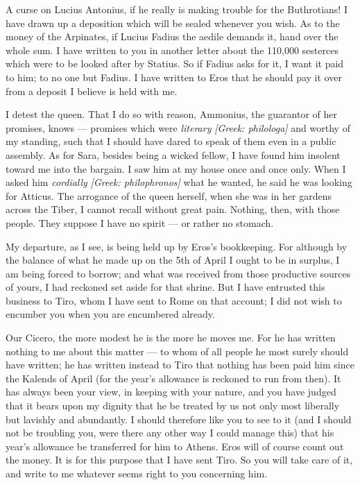 

 A curse on Lucius Antonius, if he really is making trouble for the Buthrotians! I have drawn up a deposition which will be sealed whenever you wish. As to the money of the Arpinates, if Lucius Fadius the aedile demands it, hand over the whole sum. I have written to you in another letter about the 110,000 sesterces which were to be looked after by Statius. So if Fadius asks for it, I want it paid to him; to no one but Fadius. I have written to Eros that he should pay it over from a deposit \dag I believe is held with me. \dag

 I detest the queen. That I do so with reason, Ammonius, the guarantor of her promises, knows --- promises which were \textit{literary} \textit{[Greek: philologa]} and worthy of my standing, such that I should have dared to speak of them even in a public assembly. As for Sara, besides being a wicked fellow, I have found him insolent toward me into the bargain. I saw him at my house once and once only. When I asked him \textit{cordially} \textit{[Greek: philophronos]} what he wanted, he said he was looking for Atticus. The arrogance of the queen herself, when she was in her gardens across the Tiber, I cannot recall without great pain. Nothing, then, with those people. They suppose I have no spirit --- or rather no stomach.

 My departure, as I see, is being held up by Eros's bookkeeping. For although by the balance of what he made up on the 5th of April I ought to be in surplus, I am being forced to borrow; and what was received from those productive sources of yours, I had reckoned set aside for that shrine. But I have entrusted this business to Tiro, whom I have sent to Rome on that account; I did not wish to encumber you when you are encumbered already.

 Our Cicero, the more modest he is the more he moves me. For he has written nothing to me about this matter --- to whom of all people he most surely should have written; he has written instead to Tiro that nothing has been paid him since the Kalends of April (for the year's allowance is reckoned to run from then). It has always been your view, in keeping with your nature, and you have judged \dag that it bears upon my dignity \dag that he be treated by us not only most liberally but lavishly and abundantly. I should therefore like you to see to it (and I should not be troubling you, were there any other way I could manage this) that his year's allowance be transferred for him to Athens. Eros will of course count out the money. It is for this purpose that I have sent Tiro. So you will take care of it, and write to me whatever seems right to you concerning him.
